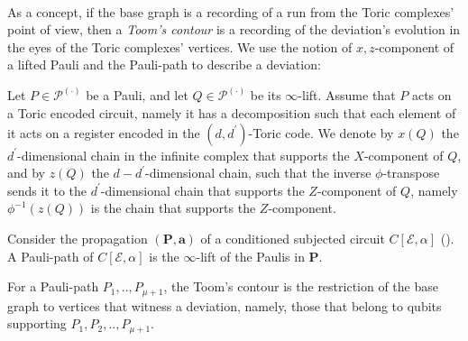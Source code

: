 \paragraph{}

As a concept, if the base graph is a recording of a run from the Toric complexes' point of view, then a \textit{Toom's contour} is a recording of the deviation's evolution in the eyes of the Toric complexes' vertices. We use the notion of $x,z$-component of a lifted Pauli and the Pauli-path to describe a deviation:
\begin{definition}
Let $P \in \mathcal{P}^{(\cdot)}$ be a Pauli, and let $Q \in \mathcal{P}^{(\cdot)}$ be its $\infty$-lift. Assume that $P$ acts on a Toric encoded circuit, namely it has a decomposition such that each element of it acts on a register encoded in the $(d,d^{\prime})$-Toric code. We denote by $x(Q)$ the $d^{\prime}$-dimensional chain in the infinite complex that supports the $X$-component of $Q$, and by $z(Q)$ the $d-d^{\prime}$-dimensional chain, such that the inverse $\phi$-transpose sends it to the $d^{\prime}$-dimensional chain that supports the $Z$-component of $Q$, namely $\phi^{-1}(z(Q))$ is the chain that supports the $Z$-component.



\end{definition}

\begin{definition}
  \label{def:paulipath}
  Consider the propagation $(\mathbf{P},\mathbf{a})$ of a conditioned subjected circuit $C[\mathcal{E},\alpha]$ (). A Pauli-path of $C[\mathcal{E},\alpha]$ is the $\infty$-lift of the Paulis in $\mathbf{P}$.
 

\end{definition}


For a Pauli-path $P_{1},..,P_{\mu+1}$, the Toom's contour is the restriction of the base graph to vertices that witness a deviation, namely, those that belong to qubits supporting $P_{1},P_{2},..,P_{\mu+1}$. 


